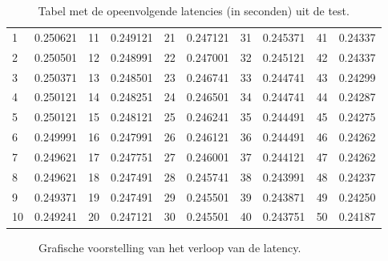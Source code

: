 \begin{table}[h!]
	\caption{Tabel met de opeenvolgende latencies (in seconden) uit de test.}
	\centering
	\begin{tabular}{l l|l l|l l|l l|l l}
		1 & 0.250621 & 11 & 0.249121 & 21 & 0.247121 & 31 & 0.245371 & 41 & 0.24337 \\
		2 & 0.250501 & 12 & 0.248991 & 22 & 0.247001 & 32 & 0.245121 & 42 & 0.24337 \\
		3 & 0.250371 & 13 & 0.248501 & 23 & 0.246741 & 33 & 0.244741 & 43 & 0.24299 \\
		4 & 0.250121 & 14 & 0.248251 & 24 & 0.246501 & 34 & 0.244741 & 44 & 0.24287 \\
		5 & 0.250121 & 15 & 0.248121 & 25 & 0.246241 & 35 & 0.244491 & 45 & 0.24275 \\
		6 & 0.249991 & 16 & 0.247991 & 26 & 0.246121 & 36 & 0.244491 & 46 & 0.24262 \\
		7 & 0.249621 & 17 & 0.247751 & 27 & 0.246001 & 37 & 0.244121 & 47 & 0.24262 \\
		8 & 0.249621 & 18 & 0.247491 & 28 & 0.245741 & 38 & 0.243991 & 48 & 0.24237 \\
		9 & 0.249371 & 19 & 0.247491 & 29 & 0.245501 & 39 & 0.243871 & 49 & 0.24250 \\
		10 & 0.249241 & 20 & 0.247121 & 30 & 0.245501 & 40 & 0.243751 & 50 & 0.24187 \\
	\end{tabular}
	\label{results-table}
\end{table}


\begin{figure}[h!]
	\captionsetup{width=0.7\textwidth}
	\caption[Praktijktest resultaten]{Grafische voorstelling van het verloop van de latency.}
	\begin{center}
		\advance\parskip0.3cm
		
	\end{center}
	\label{test-latency-graph}
\end{figure}
